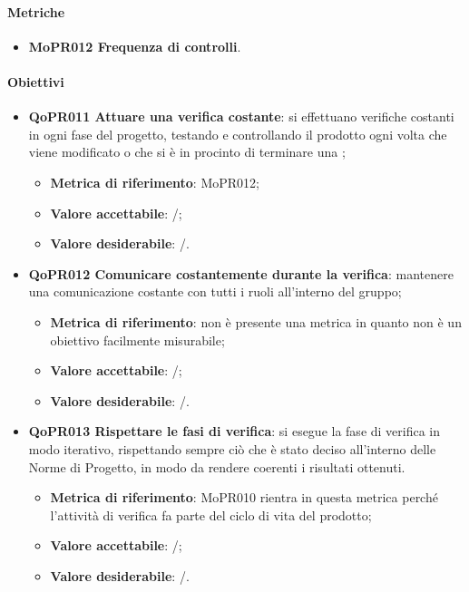 \documentclass[../piano-di-qualifica.tex]{subfiles}
\begin{document}
\paragraph{Metriche}
\label{sub:metriche_4}
\begin{itemize}
    \item \textbf{MoPR012 Frequenza di controlli}.
\end{itemize}

\paragraph{Obiettivi}
\label{sub:obiettivi_4}
\begin{itemize}
    \item \textbf{QoPR011 Attuare una verifica costante}: si effettuano verifiche costanti in ogni fase del progetto, testando e controllando il prodotto ogni volta che viene modificato o che si è in procinto di terminare una ;
    \begin{itemize}
        \item \textbf{Metrica di riferimento}: MoPR012;
        \item \textbf{Valore accettabile}: /; %
        \item \textbf{Valore desiderabile}: /.
    \end{itemize}
    \item \textbf{QoPR012 Comunicare costantemente durante la verifica}: mantenere una comunicazione costante con tutti i ruoli all'interno del gruppo;
    \begin{itemize}
        \item \textbf{Metrica di riferimento}: non è presente una metrica in quanto non è un obiettivo facilmente misurabile;
        \item \textbf{Valore accettabile}: /; %
        \item \textbf{Valore desiderabile}: /.
    \end{itemize}
    \item \textbf{QoPR013 Rispettare le fasi di verifica}: si esegue la fase di verifica in modo iterativo, rispettando sempre ciò che è stato deciso all'interno delle Norme di Progetto, in modo da rendere coerenti i risultati ottenuti.
        \begin{itemize}
            \item \textbf{Metrica di riferimento}: MoPR010 rientra in questa metrica perché l'attività di verifica fa parte del ciclo di vita del prodotto;
            \item \textbf{Valore accettabile}: /; %
            \item \textbf{Valore desiderabile}: /.
        \end{itemize}
\end{itemize}
\end{document}
